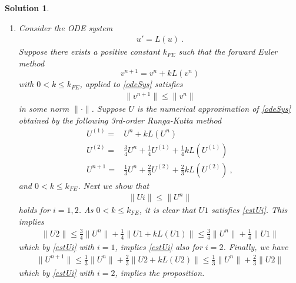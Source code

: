 \documentclass[10pt,letterpaper]{article}
\newcommand{\hpar}{} %
\newcommand{\frb}[1]{ \left(  {#1} \right) }
\newcommand{\norm}[1]{ \left\|  {#1} \right\| }
\theoremstyle{break}
\newtheorem{mysolution}{Solution}
\newenvironment{solution}{\begin{mysolution}}{\end{mysolution}}
\begin{document}
\begin{solution}
\begin{enumerate}
	\item
	Consider the ODE system
	\begin{gather} 
		u'=L(u)\ .
	\end{gather}
	Suppose there exists a positive constant $k_{FE}$ such that the forward Euler method
	$$
		v^{n+1}=v^n+kL\frb{v^n}
	$$
	with $0< k\le k_{FE}$, applied to \eqref{odeSys} satisfies
	\begin{gather} 
		\|v^{n+1}\|\le\|v^n\|
	\end{gather}
	in some norm $\|\cdot\|$.
	Suppose $U$ is the numerical approximation of \eqref{odeSys} obtained by the following 3rd-order Runga-Kutta method
	\begin{align*}
		U^{\left(1\right)}= & U^{n}+kL\left(U^{n}\right)\\
		U^{\left(2\right)}= & \frac{3}{4}U^{n}+\frac{1}{4}U^{\left(1\right)}+\frac{1}{4}kL\frb{U^{\left(1\right)}}\\
		U^{n+1}= & \frac{1}{3}U^{n}+\frac{2}{3}U^{\left(2\right)}+\frac{2}{3}kL\frb{U^{\left(2\right)}}\ ,
	\end{align*}
	and $0< k\le k_{FE}$. Next we show that
	\begin{gather} \label{estUi}
		\|U\hpar{i}\|\le\|U^n\|
	\end{gather}
	holds for $i=1,2$.
	As $0<k\le k_{FE}$, it is clear that $U\hpar{1}$ satisfies \eqref{estUi}.
	This implies
	\begin{gather}
		\|U\hpar{2}\|\le \frac{3}{4}\|U^n\| +\frac{1}{4}\norm{U\hpar{1} +kL\frb{U\hpar{1}}}
			\le \frac{3}{4}\|U^n\| +\frac{1}{4}\|U\hpar{1}\|
	\end{gather}
	which by \eqref{estUi} with $i=1$, implies \eqref{estUi} also for $i=2$.
	Finally, we have
	\begin{gather}
		\|U^{n+1}\|\le \frac{1}{3}\|U^n\| +\frac{2}{3}\norm{U\hpar{2} +kL\frb{U\hpar{2}}}
			\le \frac{1}{3}\|U^n\| +\frac{2}{3}\|U\hpar{2}\|
	\end{gather}
	which by \eqref{estUi} with $i=2$, implies the proposition.
	\end{enumerate}
\end{solution}
\end{document}

